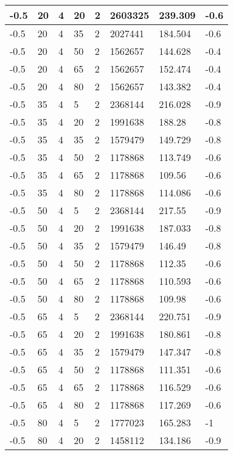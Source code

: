 \begin{longtable}{|p{1.4cm}|p{1.4cm}|p{1.4cm}|p{1.4cm}|p{1.4cm}|p{1.4cm}|p{1.4cm}|p{1.5cm}|}
        -0.5 & 20 & 4 & 20 & 2 & 2603325 & 239.309 & -0.6 \\ \hline
        -0.5 & 20 & 4 & 35 & 2 & 2027441 & 184.504 & -0.6 \\ \hline
        -0.5 & 20 & 4 & 50 & 2 & 1562657 & 144.628 & -0.4 \\ \hline
        -0.5 & 20 & 4 & 65 & 2 & 1562657 & 152.474 & -0.4 \\ \hline
        -0.5 & 20 & 4 & 80 & 2 & 1562657 & 143.382 & -0.4 \\ \hline
        -0.5 & 35 & 4 & 5 & 2 & 2368144 & 216.028 & -0.9 \\ \hline
        -0.5 & 35 & 4 & 20 & 2 & 1991638 & 188.28 & -0.8 \\ \hline
        -0.5 & 35 & 4 & 35 & 2 & 1579479 & 149.729 & -0.8 \\ \hline
        -0.5 & 35 & 4 & 50 & 2 & 1178868 & 113.749 & -0.6 \\ \hline
        -0.5 & 35 & 4 & 65 & 2 & 1178868 & 109.56 & -0.6 \\ \hline
        -0.5 & 35 & 4 & 80 & 2 & 1178868 & 114.086 & -0.6 \\ \hline
        -0.5 & 50 & 4 & 5 & 2 & 2368144 & 217.55 & -0.9 \\ \hline
        -0.5 & 50 & 4 & 20 & 2 & 1991638 & 187.033 & -0.8 \\ \hline
        -0.5 & 50 & 4 & 35 & 2 & 1579479 & 146.49 & -0.8 \\ \hline
        -0.5 & 50 & 4 & 50 & 2 & 1178868 & 112.35 & -0.6 \\ \hline
        -0.5 & 50 & 4 & 65 & 2 & 1178868 & 110.593 & -0.6 \\ \hline
        -0.5 & 50 & 4 & 80 & 2 & 1178868 & 109.98 & -0.6 \\ \hline
        -0.5 & 65 & 4 & 5 & 2 & 2368144 & 220.751 & -0.9 \\ \hline
        -0.5 & 65 & 4 & 20 & 2 & 1991638 & 180.861 & -0.8 \\ \hline
        -0.5 & 65 & 4 & 35 & 2 & 1579479 & 147.347 & -0.8 \\ \hline
        -0.5 & 65 & 4 & 50 & 2 & 1178868 & 111.351 & -0.6 \\ \hline
        -0.5 & 65 & 4 & 65 & 2 & 1178868 & 116.529 & -0.6 \\ \hline
        -0.5 & 65 & 4 & 80 & 2 & 1178868 & 117.269 & -0.6 \\ \hline
        -0.5 & 80 & 4 & 5 & 2 & 1777023 & 165.283 & -1 \\ \hline
        -0.5 & 80 & 4 & 20 & 2 & 1458112 & 134.186 & -0.9 \\ \hline

\end{longtable}
